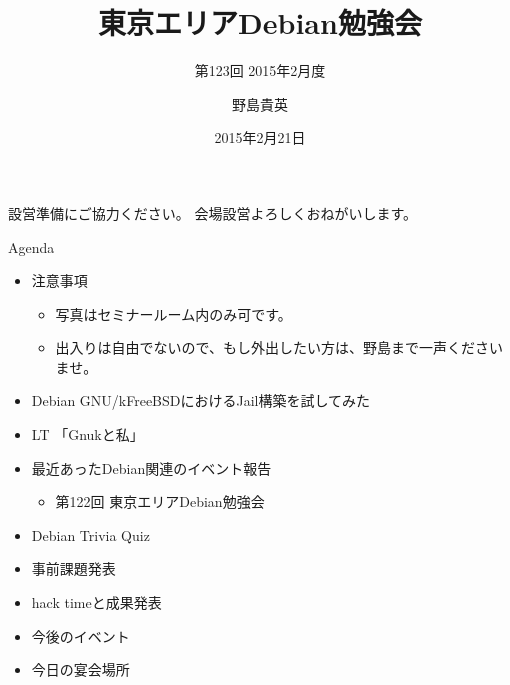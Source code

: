 \title{東京エリアDebian勉強会}
\subtitle{第123回 2015年2月度}
\author{野島貴英}
\date{2015年2月21日}



\begin{frame}
\titlepage{}
\end{frame}

\begin{frame}{設営準備にご協力ください。}
会場設営よろしくおねがいします。
\end{frame}

\begin{frame}{Agenda}
 \begin{minipage}[t]{0.45\hsize}
  \begin{itemize}
   \item 注意事項
	 \begin{itemize}
	  \item 写真はセミナールーム内のみ可です。
          \item 出入りは自由でないので、もし外出したい方は、野島まで一声くださいませ。
	 \end{itemize}
   \item Debian GNU/kFreeBSDにおけるJail構築を試してみた
  \end{itemize}
 \end{minipage} 
 \begin{minipage}[t]{0.45\hsize}
  \begin{itemize}
    \item LT 「Gnukと私」
    \item 最近あったDebian関連のイベント報告
	 \begin{itemize}
	  \item 第122回 東京エリアDebian勉強会
	 \end{itemize}
   \item Debian Trivia Quiz
   \item 事前課題発表
   \item hack timeと成果発表
   \item 今後のイベント
   \item 今日の宴会場所
  \end{itemize}
 \end{minipage}
\end{frame}

